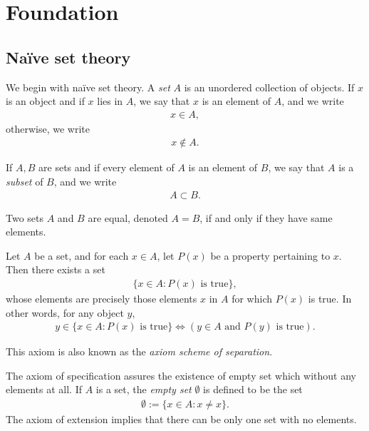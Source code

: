 
\chapter{Foundation}

\section{Na\"ive set theory}

We begin with na\"ive set theory. A \emph{set} $A$ is an unordered collection of objects. If $x$ is an object and if $x$ lies in $A$, we say that $x$ is an element of $A$, and we write
    \begin{align*}
        x \in A,
    \end{align*}
otherwise, we write
    \begin{align*}
        x \notin A.
    \end{align*}

If $A, B$ are sets and if every element of $A$ is an element of $B$, we say that $A$ is a \emph{subset} of $B$, and we write
    \begin{align*}
        A \subset B.
    \end{align*}


\begin{axiom}
    Two sets $A$ and $B$ are equal, denoted $A = B$, if and only if they have same elements.
\end{axiom}

\begin{axiom}
    Let $A$ be a set, and for each $x \in A$, let $P(x)$ be a property pertaining to $x$. Then there exists a set 
    \begin{align*}
        \{x \in A : P(x) \text{ is true}\},
    \end{align*}
    whose elements are precisely those elements $x$ in $A$ for which $P(x)$ is true. In other words, for any object $y$,
        \begin{align*}
            y \in \{x \in A : P(x) \text{ is true}\}
            \Longleftrightarrow 
            (y \in A \text{ and } P(y) \text{ is true}).
        \end{align*}
\end{axiom}

This axiom is also known as the \emph{axiom scheme of separation}.

The axiom of specification assures the existence of empty set which without any elements at all. If $A$ is a set, the \emph{empty set} $\emptyset$ is defined to be the set
        \begin{align*}
            \emptyset := \{x \in A : x \neq x\}.
        \end{align*}
The axiom of extension implies that there can be only one set with no elements.


